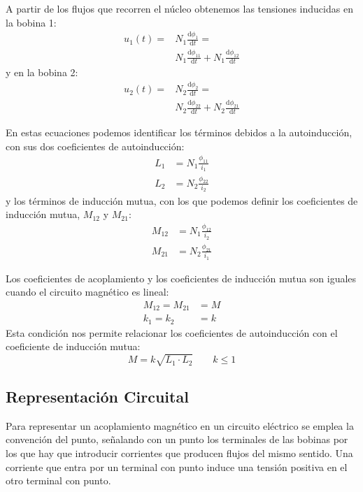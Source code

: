 A partir de los flujos que recorren el núcleo obtenemos las tensiones inducidas en la bobina 1:
\begin{align*}
  u_1(t) = &N_1 \frac{\mathrm{d}\phi_1}{\mathrm{d}t} = \\
  &N_1 \frac{\mathrm{d}\phi_{11}}{\mathrm{d}t} + N_1 \frac{\mathrm{d}\phi_{12}}{\mathrm{d}t}
\end{align*}
y en la bobina 2:
\begin{align*}
  u_2(t) = &N_2 \frac{\mathrm{d}\phi_2}{\mathrm{d}t} = \\
  &N_2 \frac{\mathrm{d}\phi_{22}}{\mathrm{d}t} + N_2 \frac{\mathrm{d}\phi_{21}}{\mathrm{d}t}
\end{align*}

En estas ecuaciones podemos identificar los términos debidos a la autoinducción, con sus dos coeficientes de autoinducción:
\begin{align}
  \label{eq:acoplamiento-autoinduccion}
  L_1 &= N_1 \frac{\phi_{11}}{i_1}\\
  L_2 &= N_2 \frac{\phi_{22}}{i_2}
\end{align}
y los términos de inducción mutua, con los que podemos definir los coeficientes de inducción mutua, $M_{12}$ y $M_{21}$:
\begin{align}
  \label{eq:coef-induccion-mutua}
  M_{12} &= N_1 \frac{\phi_{12}}{i_2}\\
  M_{21} &= N_2 \frac{\phi_{21}}{i_1}
\end{align}

Los coeficientes de acoplamiento y los coeficientes de inducción mutua son iguales cuando el circuito magnético es lineal:
  \begin{align*}
  M_{12} = M_{21} &= M\\
  k_1 = k_2 &= k    
  \end{align*}
  Esta condición nos permite relacionar los coeficientes de autoinducción con el coeficiente de inducción mutua:
  \begin{equation}
    \label{eq:L-M}
    \boxed{M = k \sqrt{L_1 \cdot L_2}} \qquad  k \leq 1
  \end{equation}

  \subsection{Representación Circuital}
  \label{sec:org1754ad3}
  Para representar un acoplamiento magnético en un circuito eléctrico
  se emplea la convención del punto, señalando con un punto los
  terminales de las bobinas por los que hay que introducir corrientes
  que producen flujos del mismo sentido. Una corriente que entra por
  un terminal con punto induce una tensión positiva en el otro
  terminal con punto.

